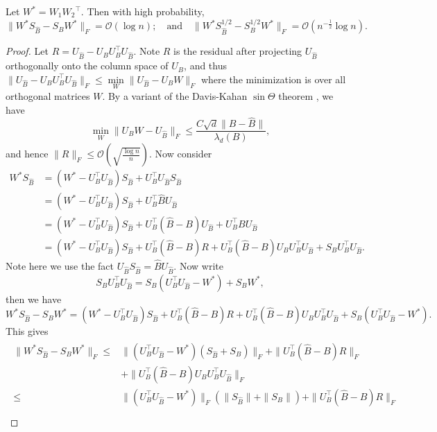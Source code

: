 \begin{lemma}
\label{appthm9}
  Let $W^{*} = W_1{W_2}^\top$. Then with high probability,
  $$\|W^{*}S_{\hat{B}} - S_{B}W^{*}\|_{F} = \mathcal{O}(\log n); \quad \text{and} \quad \|W^{*} S_{\hat{B}}^{1/2} - S_{B}^{1/2} W^{*}\|_{F} = \mathcal{O}(n^{-\frac{1}{2}} \log n).$$
\end{lemma}
\begin{proof}
  Let $R = U_{\hat{B}} - U_BU_B^{\top} U_{\hat{B}}.$ Note $R$ is the residual after projecting $U_{\hat{B}}$ orthogonally onto the column space of  $U_{B}$, and thus $\|U_{\hat{B}} - U_B U_B^{\top} U_{\hat{B}}\|_{F} \leq \min\limits_{W} \|U_{\hat{B}} - U_B W \|_{F}$ where the minimization is over all orthogonal matrices $W$. 
  By a variant of the Davis-Kahan $\sin \Theta$ theorem \citep{vD-K}, we have
   $$\min\limits_{W}\|U_BW - U_{\hat{B}} \|_{F} \leq \frac{C \sqrt{d} \|B - \hat{B}\|}{\lambda_d(B)} ,$$ and hence $\|R\|_F \leq \mathcal{O}(\sqrt{\frac{\log n}{n}}).$
   Now consider 
   \begin{align*}
    W^{*}S_{\hat{B}}
    & = (W^{*} - U_B^{\top} U_{\hat{B}}) S_{\hat{B}} + U_B^{\top} U_{\hat{B}} S_{\hat{B}} \\
    & = (W^{*} - U_B^{\top} U_{\hat{B}}) S_{\hat{B}} + U_B^{\top} \hat{B} U_{\hat{B}}  \\
    & = (W^{*} - U_B^{\top} U_{\hat{B}}) S_{\hat{B}} + U_B^{\top} (\hat{B} - B) U_{\hat{B}} + U_B^{\top} B U_{\hat{B}} \\
    & = (W^{*} - U_B^{\top} U_{\hat{B}}) S_{\hat{B}} +  U_B^{\top} (\hat{B} - B) R + U_B^{\top} (\hat{B} - B) U_B U_B^{\top} U_{\hat{B}} + S_B U_B^{\top} U_{\hat{B}}.
   \end{align*}
   Note here we use the fact $U_{\hat{B}} S_{\hat{B}} = \hat{B} U_{\hat{B}}.$
   Now write $$S_B U_B^{\top} U_{\hat{B}} = S_B(U_B^{\top} U_{\hat{B}} - W^{*}) + S_B W^{*},$$
   then we have $$W^{*}S_{\hat{B}} - S_B W^{*}  = (W^{*} - U_B^{\top} U_{\hat{B}}) S_{\hat{B}} + U_B^{\top} (\hat{B} -B) R + U_B^{\top} (\hat{B} -B) U_B U_B^{\top} U_{\hat{B}} + S_B (U_B^{\top} U_{\hat{B}} - W^{*}).$$
   This gives 
   \begin{align*}
     \begin{array}{rl}
      \|W^{*}S_{\hat{B}} - S_B W^{*}\|_{F} 
      \leq & \| (U_B^{\top} U_{\hat{B}} - W^{*}) (S_{\hat{B}} + S_B) \|_{F} + \| U_B^{\top} (\hat{B} - B) R \|_{F} \\
      & + \| U_B^{\top} (\hat{B} - B) U_B U_B^{\top} U_{\hat{B}}\|_{F} \\
       \leq & \| (U_B^{\top} U_{\hat{B}} - W^{*})\|_{F}  (\|S_{\hat{B}}\| + \|S_B\|) + \| U_B^{\top} (\hat{B} - B) R \|_{F} \\

\end{array}
\end{align*}
\end{proof}
